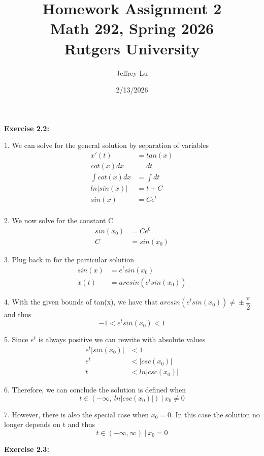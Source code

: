 \documentclass[12pt]{article}
\title{Homework Assignment 2 \\ \large Math 292, Spring 2026 \\ Rutgers University}
\author{Jeffrey Lu}
\date{2/13/2026}
\begin{document}
\maketitle

\noindent \textbf{Exercise 2.2:}

1. We can solve for the general solution by separation of variables
\begin{align*}
  x'(t)          & = tan(x)   \\
  cot(x)dx       & = dt       \\
  \int{cot(x)dx} & = \int{dt} \\
  ln|sin(x)|     & = t + C    \\
  sin(x)         & = Ce^t     \\
\end{align*}

2. We now solve for the constant C
\begin{align*}
  sin(x_0) & = Ce^{0}   \\
  C        & = sin(x_0)
\end{align*}

3. Plug back in for the particular solution
\begin{align*}
  sin(x) & = e^t sin(x_0)         \\
  x(t)   & = arcsin(e^t sin(x_0))
\end{align*}

4. With the given bounds of tan(x), we have that  $arcsin(e^tsin(x_0)) \neq{} \pm{\dfrac{\pi{}}{2}}$ and thus
\[
  -1 < e^t sin(x_0) < 1
\]

5. Since $e^t$ is always positive we can rewrite with absolute values
\begin{align*}
  e^t |sin(x_0)| & < 1            \\
  e^t            & < |csc(x_0)|   \\
  t              & < ln|csc(x_0)|
\end{align*}

6. Therefore, we can conclude the solution is defined when
\[
  t \in{(-\infty{},~ ln|csc(x_0)|)} ~|~ x_0 \neq{0}
\]

7. However, there is also the special case when $x_0=0$. In this case the solution no longer depends on t and thus
\[
  t\in{(-\infty, \infty)} ~|~ x_0 = 0
\]

\noindent \textbf{Exercise 2.3:}
\end{document}
